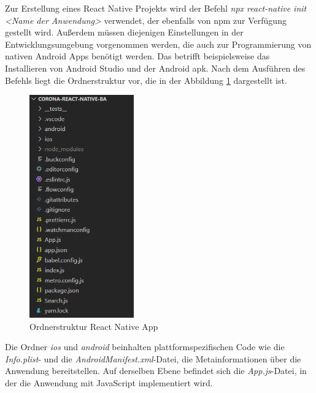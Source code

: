Zur Erstellung eines React Native Projekts wird der Befehl \textit{npx react-native init <Name der Anwendung>} verwendet, der ebenfalls von npm zur Verfügung gestellt wird.
Außerdem müssen diejenigen Einstellungen in der Entwicklungsumgebung vorgenommen werden, die auch zur Programmierung von nativen Android Apps benötigt werden.
Das betrifft beispielsweise das Installieren von Android Studio und der Android \ac{apk}.
Nach dem Ausführen des Befehls liegt die Ordnerstruktur vor, die in der Abbildung \ref{fig:structure_rn} dargestellt ist.

\begin{figure}[h]
 \centering
 \includegraphics[width=0.4\textwidth]{figures/Structure_RN.png}
 \caption{Ordnerstruktur React Native App}
 \label{fig:structure_rn}
\end{figure}

Die Ordner \textit{ios} und \textit{android} beinhalten plattformspezifischen Code wie die \textit{Info.plist}- und die \textit{AndroidManifest.xml}-Datei, die Metainformationen über die Anwendung bereitstellen.
Auf derselben Ebene befindet sich die \textit{App.js}-Datei, in der die Anwendung mit JavaScript implementiert wird.

